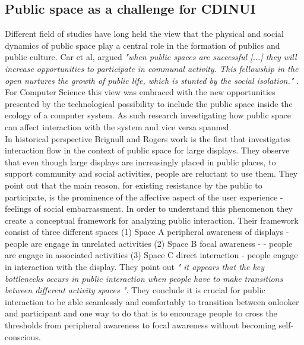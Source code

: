 \subsection{Public space as a challenge for CDINUI}
Different field of studies have long held the view that the physical and social dynamics of public space play a central role in the formation of publics and public culture. Car et al, argued \emph{"when public spaces are successful [...] they will increase opportunities to participate in communal activity. This fellowship in the open nurtures the growth of public life, which is stunted by the social isolation."} \cite{carr:1992}. For Computer Science this view was embraced with the new opportunities presented by the technological possibility to include the public space inside the ecology of a computer system. As such research investigating how public space can affect interaction with the system and vice versa spanned.\\

In historical perspective Brignull and Rogers work\cite{Brignull:2003} is the first that investigates interaction flow in the context of public space for large displays. They observe that even though large displays are increasingly placed in public places, to support community and social activities, people are reluctant to use them. They point out that the main reason, for existing resistance by the public to participate, is the prominence of the affective aspect of the  user experience - feelings of social embarrassment. In order to understand this phenomenon they create a conceptual framework for analyzing public interaction. Their framework consist of three different spaces (1) Space A peripheral awareness of displays - people are engage in unrelated activities (2) Space B focal awareness - - people are engage in associated activities (3) Space C direct interaction - people engage in interaction with the display. They point out \emph{" it appears that the key bottlenecks occurs in public interaction when people have to make transitions between different activity spaces "}. They conclude  it is crucial for public interaction to be able seamlessly and comfortably to transition between onlooker and participant and one way to do that is to encourage people to cross the thresholds from peripheral awareness to focal awareness without becoming self-conscious.\\

